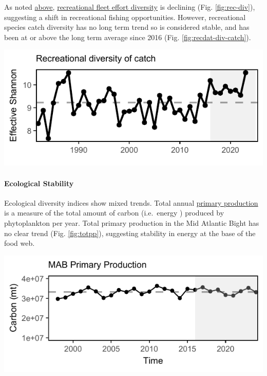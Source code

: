 \documentclass[
  10pt,
]{article}
\let\origfigure\figure
\let\endorigfigure\endfigure
\renewenvironment{figure}[1][2] {
    \expandafter\origfigure\expandafter[H]
} {
    \endorigfigure
}
\begin{document}
As noted \hyperref[recreational-opportunities]{above}, \href{https://noaa-edab.github.io/catalog/recdat.html}{recreational fleet effort diversity} is declining (Fig. \ref{fig:rec-div}), suggesting a shift in recreational fishing opportunities. However, recreational species catch diversity has no long term trend so is considered stable, and has been at or above the long term average since 2016 (Fig. \ref{fig:recdat-div-catch}).

\begin{figure}

{\centering \includegraphics{midatlantic_files/figure-latex/recdat-div-catch-1} 

}

\caption{Diversity of recreational catch in the Mid Atlantic.}\label{fig:recdat-div-catch}
\end{figure}

\paragraph{Ecological Stability}\label{ecological-stability}

Ecological diversity indices show mixed trends. Total annual \href{https://noaa-edab.github.io/catalog/chl_pp.html}{primary production} is a measure of the total amount of carbon (i.e.~energy ) produced by phytoplankton per year. Total primary production in the Mid Atlantic Bight has no clear trend (Fig. \ref{fig:totpp}), suggesting stability in energy at the base of the food web.

\begin{figure}

{\centering \includegraphics{midatlantic_files/figure-latex/totpp-1} 

}

\caption{Total areal annual primary production for the MAB. The dashed line represents the long-term (1998-2024) annual mean.}\label{fig:totpp}
\end{figure}
\end{document}
